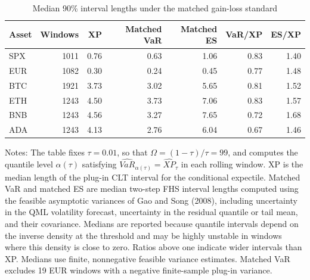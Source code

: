 \begin{table}[t]
\centering
\caption{Median 90\% interval lengths under the matched gain-loss standard}
\label{tab:app_interval_widths}
\begin{tabular}{lrrrrrr}
\toprule
Asset & Windows & XP & Matched VaR & Matched ES & VaR/XP & ES/XP \\
\midrule
SPX & 1011 & 0.76 & 0.63 & 1.06 & 0.83 & 1.40 \\
EUR & 1082 & 0.30 & 0.24 & 0.45 & 0.77 & 1.48 \\
BTC & 1921 & 3.73 & 3.02 & 5.65 & 0.81 & 1.52 \\
ETH & 1243 & 4.50 & 3.73 & 7.06 & 0.83 & 1.57 \\
BNB & 1243 & 4.56 & 3.27 & 7.65 & 0.72 & 1.68 \\
ADA & 1243 & 4.13 & 2.76 & 6.04 & 0.67 & 1.46 \\
\bottomrule
\end{tabular}
\begin{flushleft}
\footnotesize
Notes: The table fixes \(\tau=0.01\), so that \(\Omega=(1-\tau)/\tau=99\),
and computes the quantile level \(\alpha(\tau)\) satisfying
\(\widehat{VaR}_{\alpha(\tau)}=\widehat{XP}_{\tau}\) in each rolling window.
XP is the median length of the plug-in CLT interval for the conditional expectile.
Matched VaR and matched ES are median two-step FHS interval lengths computed using
the feasible asymptotic variances of Gao and Song (2008), including uncertainty in
the QML volatility forecast, uncertainty in the residual quantile or tail mean, and
their covariance. Medians are reported because
quantile intervals depend on the inverse density at the threshold and may be highly
unstable in windows where this density is close to zero. Ratios above one indicate
wider intervals than XP.
Medians use finite, nonnegative feasible variance estimates.
Matched VaR excludes 19 EUR windows with a negative finite-sample plug-in variance.
\end{flushleft}
\end{table}
